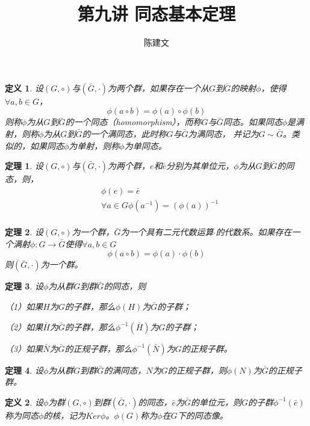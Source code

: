 \documentclass{article}
\newtheorem{Def}{定义}
\newtheorem{Thm}{定理}
\begin{document}
\begin{CJK*}{UTF8}{gbsn}
  \title{第九讲 同态基本定理}
  \author{陈建文}
  \maketitle
  

\begin{Def}
  设$(G,\circ)$与$(\bar{G},\cdot)$为两个群，如果存在一个从$G$到$\bar{G}$的映射$\phi$，使得$\forall a,b\in G$，\[\phi(a\circ b)=\phi(a)\circ \phi(b)\]
  则称$\phi$为从$G$到$\bar{G}$的一个同态（homomorphism），而称$G$与$\bar{G}$同态。如果同态$\phi$是满射，则称$\phi$为从$G$到$\bar{G}$的一个满同态，此时称$G$与$\bar{G}$为满同态，
  并记为$G\sim \bar{G}$。类似的，如果同态$\phi$为单射，则称$\phi$为单同态。
\end{Def}

\begin{Thm}
  设$(G,\circ)$与$(\bar{G},\cdot)$为两个群，$e$和$\bar{e}$分别为其单位元，$\phi$为从$G$到$\bar{G}$的同态，则，
  \begin{align*}
    &\phi(e)=\bar{e}\\
    &\forall a\in G \phi(a^{-1})=(\phi(a))^{-1}\\
  \end{align*}
\end{Thm}

\begin{Thm}
  设$(G,\circ)$为一个群，$\bar{G}$为一个具有二元代数运算$\cdot$的代数系。如果存在一个满射$\phi:G\to \bar{G}$使得$\forall a,b\in G$
  \[\phi(a\circ b)=\phi(a) \cdot \phi(b)\]
  则$(\bar{G},\cdot)$为一个群。
\end{Thm}

\begin{Thm}
  设$\phi$为从群$G$到群$\bar{G}$的同态，则

  （1）如果$H$为$G$的子群，那么$\phi(H)$为$\bar{G}$的子群；

  （2）如果$\bar{H}$为$\bar{G}$的子群，那么$\phi^{-1}(\bar{H})$为$G$的子群；

  （3）如果$\bar{N}$为$\bar{G}$的正规子群，那么$\phi^{-1}(\bar{N})$为$G$的正规子群。
\end{Thm}

\begin{Thm}
设$\phi$为从群$G$到群$\bar{G}$的满同态，$N$为$G$的正规子群，则$\phi(N)$为$\bar{G}$的正规子群。
\end{Thm}

\begin{Def}
设$\phi$为群$(G,\circ)$到群$(\bar{G},\cdot)$的同态，$\bar{e}$为$\bar{G}$的单位元，则$G$的子群$\phi^{-1}(\bar{e})$称为同态$\phi$的核，记为$Ker \phi$。$\phi(G)$称为$\phi$在$G$下的同态像。
\end{Def}


\end{CJK*}
\end{document}
